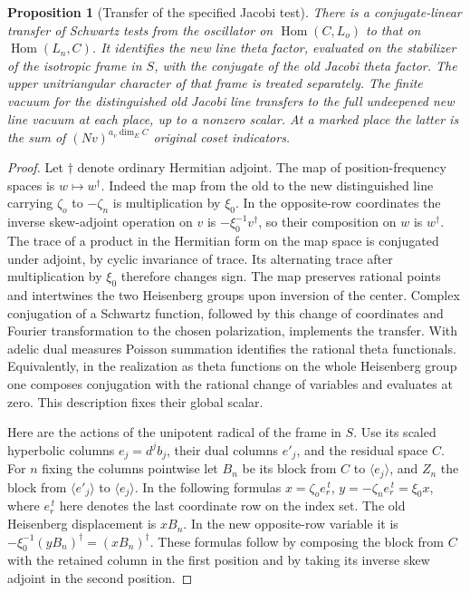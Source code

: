 \documentclass[a4paper,11pt]{article}
\newtheorem{proposition}{Proposition}[section]
\theoremstyle{definition}
\theoremstyle{remark}
\numberwithin{equation}{section}
\begin{document}
\begin{proposition}[Transfer of the specified Jacobi test]\leavevmode
\label{prop:linkedline265}
There is a conjugate-linear transfer of Schwartz tests from
the oscillator on \(\operatorname{Hom}(C,L_o)\) to that on
\(\operatorname{Hom}(L_n,C)\). It identifies the new line theta
factor, evaluated on the stabilizer of the isotropic frame in
\(S\), with the conjugate of the old Jacobi theta factor.
The upper unitriangular character of that frame is treated
separately. The finite vacuum for the distinguished old Jacobi
line transfers to the full undeepened new line vacuum at each
place, up to a nonzero scalar. At a marked place the latter is
the sum of \((Nv)^{a_v\dim_E C}\) original coset indicators.
\end{proposition}
\begin{proof}
Let \(\dagger\) denote ordinary Hermitian adjoint. The map of
position-frequency spaces is \(w\mapsto w^\dagger\). Indeed
the map from the old to the new distinguished line carrying
\(\zeta_o\) to \(-\zeta_n\) is multiplication by \(\xi_0\).
In the opposite-row coordinates the inverse skew-adjoint
operation on \(v\) is \(-\xi_0^{-1}v^\dagger\), so their
composition on \(w\) is \(w^\dagger\). The trace of a product
in the Hermitian form on the map space is conjugated under
adjoint, by cyclic invariance of trace. Its alternating trace
after multiplication by \(\xi_0\) therefore changes sign.
The map preserves rational points and intertwines the two
Heisenberg groups upon inversion of the center.
Complex conjugation of a Schwartz function, followed by this
change of coordinates and Fourier transformation to the chosen
polarization, implements the transfer. With adelic dual measures
Poisson summation identifies the rational theta functionals.
Equivalently, in the realization as theta functions on the
whole Heisenberg group one composes conjugation with the
rational change of variables and evaluates at zero. This
description fixes their global scalar.

Here are the actions of the unipotent radical of the frame in
\(S\). Use its scaled hyperbolic columns \(e_j=d^j b_j\),
their dual columns \(e'_j\), and the residual space \(C\).
For \(n\) fixing the columns pointwise let \(B_n\) be its
block from \(C\) to \(\langle e_j\rangle\), and \(Z_n\) the
block from \(\langle e'_j\rangle\) to \(\langle e_j\rangle\).
In the following formulas \(x=\zeta_o e_r^{\,t}\),
\(y=-\zeta_n e_r^{\,t}=\xi_0 x\), where \(e_r^{\,t}\)
here denotes the last coordinate row on the index set.
The old Heisenberg displacement is \(xB_n\). In the new
opposite-row variable it is
\(-\xi_0^{-1}(yB_n)^\dagger=(xB_n)^\dagger\).
These formulas follow by composing the block from \(C\)
with the retained column in the first position and by taking
its inverse skew adjoint in the second position.


\end{proof}
\end{document}
